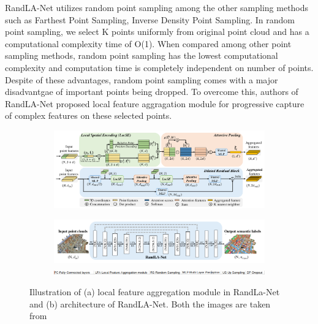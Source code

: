 RandLA-Net utilizes random point sampling among the other sampling methods such as Farthest Point Sampling, Inverse Density Point Sampling.
In random point sampling, we select K points uniformly from original point cloud and has a computational complexity time of O(1).
When compared among other point sampling methods, random point sampling has the lowest computational complexity and computation time is completely independent on number of points.
Despite of these advantages, random point sampling comes with a major disadvantgae of important points being dropped.
To overcome this, authors of RandLA-Net proposed local feature aggragation module for progressive capture of complex features on these selected points.
\begin{figure}
    \centering
    \begin{subfigure}{0.45\textwidth}
        \centering
            \includegraphics[scale=0.4, angle=90]{images/localfeatueaggregation-randlanet.png}
            \caption{}
            \label{fig:randlanetlfa}       
    \end{subfigure}
    \begin{subfigure}{0.45\textwidth}
        \centering
            \includegraphics[scale=0.55, angle=90]{images/randlanet.png}
            \includegraphics[scale=0.55, angle=90]{images/archi_expl.png}
            \caption{}
            \label{fig:networkarchitecture}
    \end{subfigure}
    \caption{Illustration of (a) local feature aggregation module in RandLa-Net and (b) architecture of RandLA-Net. Both the images are taken from \cite{Hu_2020_CVPR_Randla}}
\end{figure}

